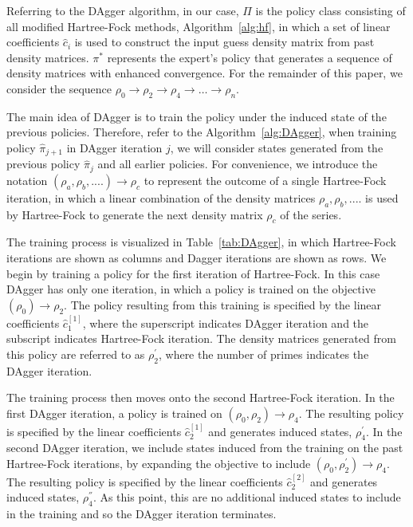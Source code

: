 \documentclass[twoside,11pt]{article}
\begin{document}
Referring to the DAgger algorithm, in our case, $\Pi$ is the policy class consisting of all modified Hartree-Fock methods, Algorithm~\ref{alg:hf}, in which a set of linear coefficients $\hat{c}_i$ is used to construct the input guess density matrix from past density matrices. $\pi^*$ represents the expert's policy that generates a sequence of density matrices with enhanced convergence. For the remainder of this paper, we consider the sequence $\rho_0 \rightarrow \rho_2 \rightarrow  \rho_4 \rightarrow  \ldots \rightarrow  \rho_{n}$. 


The main idea of DAgger is to train the policy under the induced state of the previous policies. Therefore, refer to the Algorithm~\ref{alg:DAgger}, when training policy $\hat{\pi}_{j+1}$ in DAgger iteration $j$, we will consider states generated from the previous policy $\hat{\pi}_{j}$ and all earlier policies. For convenience, we introduce the notation $(\rho_a, \rho_b, ....) \rightarrow \rho_c $ to represent the outcome of a single Hartree-Fock iteration, in which a linear combination of the density matrices $\rho_a, \rho_b, ....$ is used by Hartree-Fock to generate the next density matrix $\rho_c$ of the series. 

The training process is visualized in Table~\ref{tab:DAgger}, in which Hartree-Fock iterations are shown as columns and Dagger iterations are shown as rows. We begin by training a policy for the first iteration of Hartree-Fock. In this case DAgger has only one iteration, in which a policy is trained on the objective $(\rho_0) \rightarrow \rho_2$. The policy resulting from this training is specified by the linear coefficients $\hat{c}^{[1]}_1$, where the superscript indicates DAgger iteration and the subscript indicates Hartree-Fock iteration. The density matrices generated from this policy are referred to as $\rho_2^{'}$, where the number of primes indicates the DAgger iteration. 

The training process then moves onto the second Hartree-Fock iteration. In the first DAgger iteration, a policy is trained on $(\rho_0, \rho_2) \rightarrow \rho_4$. The resulting policy is specified by the linear coefficients $\hat{c}^{[1]}_2$ and generates induced states, $\rho_4^{'}$. In the second DAgger iteration, we include states induced from the training on the past Hartree-Fock iterations, by expanding the objective to include $(\rho_0, \rho_2^{'}) \rightarrow \rho_4$. The resulting policy is specified by the linear coefficients $\hat{c}^{[2]}_2$ and generates induced states, $\rho_4^{''}$. As this point, this are no additional induced states to include in the training and so the DAgger iteration terminates. 
\end{document}
